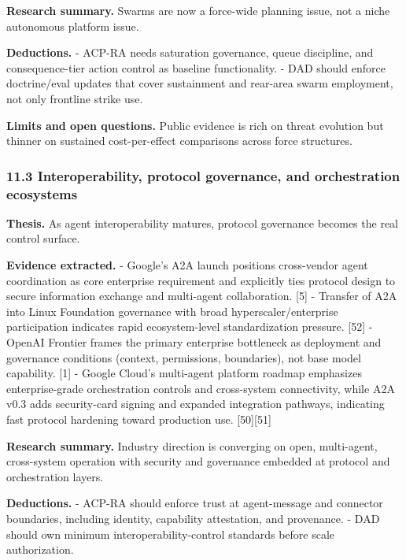 \documentclass[11pt]{article}
\begin{document}
\textbf{Research summary.} Swarms are now a force-wide planning issue,
not a niche autonomous platform issue.

\textbf{Deductions.} - ACP-RA needs saturation governance, queue
discipline, and consequence-tier action control as baseline
functionality. - DAD should enforce doctrine/eval updates that cover
sustainment and rear-area swarm employment, not only frontline strike
use.

\textbf{Limits and open questions.} Public evidence is rich on threat
evolution but thinner on sustained cost-per-effect comparisons across
force structures.

\hypertarget{interoperability-protocol-governance-and-orchestration-ecosystems}{%
\subsubsection{11.3 Interoperability, protocol governance, and
orchestration
ecosystems}\label{interoperability-protocol-governance-and-orchestration-ecosystems}}

\textbf{Thesis.} As agent interoperability matures, protocol governance
becomes the real control surface.

\textbf{Evidence extracted.} - Google's A2A launch positions
cross-vendor agent coordination as core enterprise requirement and
explicitly ties protocol design to secure information exchange and
multi-agent collaboration. {[}5{]} - Transfer of A2A into Linux
Foundation governance with broad hyperscaler/enterprise participation
indicates rapid ecosystem-level standardization pressure. {[}52{]} -
OpenAI Frontier frames the primary enterprise bottleneck as deployment
and governance conditions (context, permissions, boundaries), not base
model capability. {[}1{]} - Google Cloud's multi-agent platform roadmap
emphasizes enterprise-grade orchestration controls and cross-system
connectivity, while A2A v0.3 adds security-card signing and expanded
integration pathways, indicating fast protocol hardening toward
production use. {[}50{]}{[}51{]}

\textbf{Research summary.} Industry direction is converging on open,
multi-agent, cross-system operation with security and governance
embedded at protocol and orchestration layers.

\textbf{Deductions.} - ACP-RA should enforce trust at agent-message and
connector boundaries, including identity, capability attestation, and
provenance. - DAD should own minimum interoperability-control standards
before scale authorization.
\end{document}
